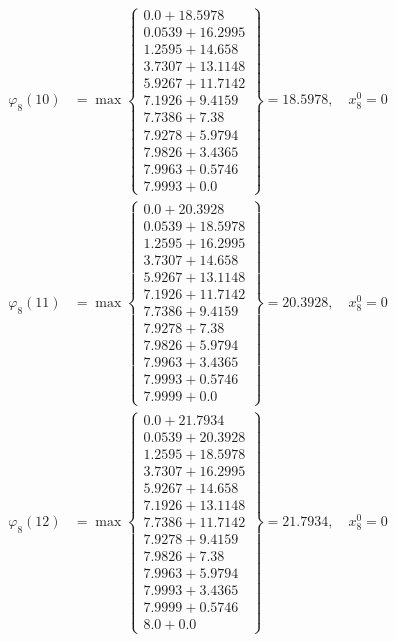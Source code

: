 \documentclass{article}
\begin{document}
\begin{align*}
\varphi_{8}(10) &= \max \left\{ \begin{array}{c}
0.0 + 18.5978 \\
 0.0539 + 16.2995 \\
 1.2595 + 14.658 \\
 3.7307 + 13.1148 \\
 5.9267 + 11.7142 \\
 7.1926 + 9.4159 \\
 7.7386 + 7.38 \\
 7.9278 + 5.9794 \\
 7.9826 + 3.4365 \\
 7.9963 + 0.5746 \\
 7.9993 + 0.0
\end{array} \right\}=18.5978, \quad x_{8}^0=0\\
  
\varphi_{8}(11) &= \max \left\{ \begin{array}{c}
0.0 + 20.3928 \\
 0.0539 + 18.5978 \\
 1.2595 + 16.2995 \\
 3.7307 + 14.658 \\
 5.9267 + 13.1148 \\
 7.1926 + 11.7142 \\
 7.7386 + 9.4159 \\
 7.9278 + 7.38 \\
 7.9826 + 5.9794 \\
 7.9963 + 3.4365 \\
 7.9993 + 0.5746 \\
 7.9999 + 0.0
\end{array} \right\}=20.3928, \quad x_{8}^0=0\\
  
\varphi_{8}(12) &= \max \left\{ \begin{array}{c}
0.0 + 21.7934 \\
 0.0539 + 20.3928 \\
 1.2595 + 18.5978 \\
 3.7307 + 16.2995 \\
 5.9267 + 14.658 \\
 7.1926 + 13.1148 \\
 7.7386 + 11.7142 \\
 7.9278 + 9.4159 \\
 7.9826 + 7.38 \\
 7.9963 + 5.9794 \\
 7.9993 + 3.4365 \\
 7.9999 + 0.5746 \\
 8.0 + 0.0
\end{array} \right\}=21.7934, \quad x_{8}^0=0\\
  

\end{align*}
\end{document}
